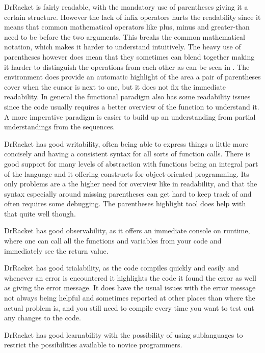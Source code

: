 \begin{description}[style=nextline]
\item[Readability] DrRacket is fairly readable, with the mandatory use of parentheses giving it a certain structure.
However the lack of infix operators hurts the readability since it means that common mathematical operators like plus, minus and greater-than need to be before the two arguments.
This breaks the common mathematical notation, which makes it harder to understand intuitively.
The heavy use of parentheses however does mean that they sometimes can blend together making it harder to distinguish the operations from each other as can be seen in .
The environment does provide an automatic highlight of the area a pair of parentheses cover when the cursor is next to one, but it does not fix the immediate readability.
In general the functional paradigm also has some readability issues since the code usually requires a better overview of the function to understand it.
A more imperative paradigm is easier to build up an understanding from partial understandings from the sequences.
\item[Writability] DrRacket has good writability, often being able to express things a little more concisely and having a consistent syntax for all sorts of function calls.
There is good support for many levels of abstraction with functions being an integral part of the language and it offering constructs for object-oriented programming.
Its only problems are a the higher need for overview like in readability, and that the syntax especially around missing parentheses can get hard to keep track of and often requires some debugging.
The parentheses highlight tool does help with that quite well though.
\item[Observability] DrRacket has good observability, as it offers an immediate console on runtime, where one can call all the functions and variables from your code and immediately see the return value.
\item[Trialability] DrRacket has good trialability, as the code compiles quickly and easily and whenever an error is encountered it highlights the code it found the error as well as giving the error message.
It does have the usual issues with the error message not always being helpful and sometimes reported at other places than where the actual problem is, and you still need to compile every time you want to test out any changes to the code.
\item[Learnability] DrRacket has good learnability with the possibility of using sublanguages to restrict the possibilities available to novice programmers.

\end{description}
